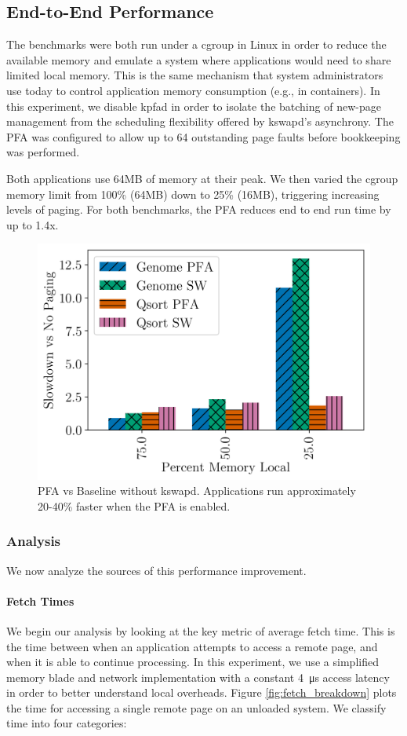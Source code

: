 \subsection{End-to-End Performance} \label{sec:fullPerf}
  The benchmarks were both run under a cgroup in Linux in order to reduce the
  available memory and emulate a system where applications would need to share
  limited local memory. This is the same mechanism that system administrators
  use today to control application memory consumption (e.g., in containers). In
  this experiment, we disable kpfad in order to isolate the batching of
  new-page management from the scheduling flexibility offered by kswapd's
  asynchrony.  The PFA was configured to allow up to 64 outstanding page faults
  before bookkeeping was performed.
  \newline
  \newline
  

  Both applications use 64MB of memory at their peak. We then
  varied the cgroup memory limit from 100\% (64MB) down to 25\% (16MB),
  triggering increasing levels of paging. For both benchmarks, the PFA reduces
  end to end run time by up to 1.4x.

  \begin{figure}[bht] \centering
    \includegraphics[width=0.5\columnwidth]{figs/perf_nokswapd.png}
    \vspace{+1cm}
    \caption{PFA vs Baseline without kswapd. Applications run approximately
    20-40\% faster when the PFA is enabled.}
    \label{fig:pfa_perf}
  \end{figure}

\subsubsection{Analysis}
  We now analyze the sources of this performance improvement.

  \paragraph{Fetch Times}
  We begin our analysis by looking at the key metric of average fetch time.
  This is the time between when an application attempts to access a remote
  page, and when it is able to continue processing. In this experiment, we use
  a simplified memory blade and network implementation with a constant
  \SI{4}{\micro\second} access latency in order to better understand local
  overheads. Figure \ref{fig:fetch_breakdown} plots the time for accessing a
  single remote page on an unloaded system. We classify time into four
  categories:


